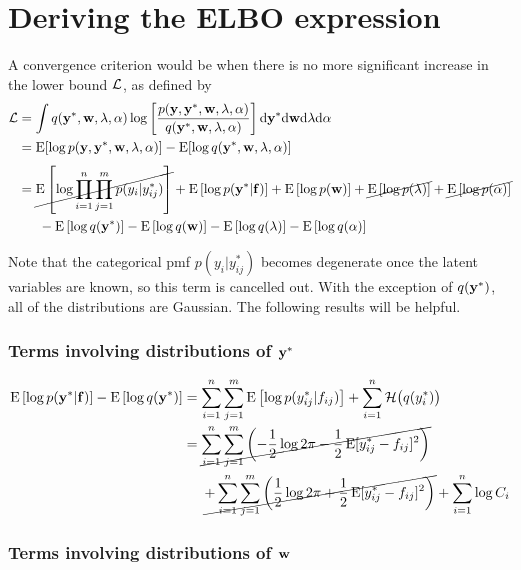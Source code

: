 \section{Deriving the ELBO expression}

A convergence criterion would be when there is no more significant increase in the lower bound ${\mathcal L}$, as defined by
\begin{align*}
  {\mathcal L} &= \int q({\mathbf y}^*,{\mathbf w},\lambda,\alpha) \log \left[ \frac{p({\mathbf y},{\mathbf y}^*,{\mathbf w},\lambda,\alpha)}{q({\mathbf y}^*,{\mathbf w},\lambda,\alpha)} \right] \text{d}{\mathbf y}^* \text{d}{\mathbf w} \text{d}\lambda \text{d}\alpha \\
  &= \operatorname{E}[\log p({\mathbf y},{\mathbf y}^*,{\mathbf w},\lambda,\alpha)] - \operatorname{E}[\log q({\mathbf y}^*,{\mathbf w},\lambda,\alpha)] \\[8pt]
  &= \cancel{\operatorname{E}\left[\log \prod_{i=1}^n \prod_{j=1}^m p(y_{i}|y_{ij}^*)\right]}
  + \operatorname{E}\left[ \log p({\mathbf y}^* | {\mathbf f}) \right]
  + \operatorname{E}\left[ \log p({\mathbf w}) \right] 
  + \cancel{\operatorname{E}\left[ \log p(\lambda) \right]}
  + \cancel{\operatorname{E}\left[ \log p(\alpha) \right]}  \\
  &\phantom{==} - \operatorname{E}\left[ \log q({\mathbf y}^*) \right]
  - \operatorname{E}\left[ \log q({\mathbf w}) \right]
  - \operatorname{E}\left[ \log q(\lambda) \right]
  - \operatorname{E}\left[ \log q(\alpha) \right]
\end{align*}

Note that the categorical pmf $p(y_i|y_{ij}^*)$ becomes degenerate once the latent variables are known, so this term is cancelled out. With the exception of $q({\mathbf y}^*)$, all of the distributions are Gaussian. The following results will be helpful. 


\subsubsection{Terms involving distributions of ${\mathbf y}^*$}

\begin{align*}
  \operatorname{E}\left[ \log p({\mathbf y}^* | {\mathbf f}) \right] - \operatorname{E}\left[ \log q({\mathbf y}^*) \right]
  &= \sum_{i=1}^n \sum_{j=1}^m \operatorname{E} \left[ \log p(y_{ij}^* | f_{ij}) \right] + \sum_{i=1}^n {\mathcal H}\big(q(y_i^*)\big) \\
  &= \cancel{\sum_{i=1}^n \sum_{j=1}^m \left( -\frac{1}{2}\log 2\pi -\frac{1}{2} \operatorname{E}[y_{ij}^* - f_{ij}]^2 \right)} \\
  &\phantom{==} \cancel{+ \sum_{i=1}^n \sum_{j=1}^m \left( \frac{1}{2}\log 2\pi + \frac{1}{2} \operatorname{E}[y_{ij}^* - f_{ij}]^2 \right)} + \sum_{i=1}^n \log C_i \\
\end{align*}

\subsubsection{Terms involving distributions of ${\mathbf w}$}

